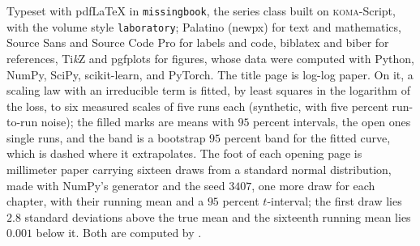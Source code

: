 \medskip
{\small\noindent Typeset with pdf\LaTeX{} in \texttt{missingbook}, the series class built on \textsc{koma}-Script, with the volume style \texttt{laboratory}; Palatino (newpx) for text and mathematics, Source Sans and Source Code Pro for labels and code, biblatex and biber for references, Ti\emph{k}Z and pgfplots for figures, whose data were computed with Python, NumPy, SciPy, scikit-learn, and PyTorch. The title page is log-log paper. On it, a scaling law with an irreducible term is fitted, by least squares in the logarithm of the loss, to six measured scales of five runs each (synthetic, with five percent run-to-run noise); the filled marks are means with $95$ percent intervals, the open ones single runs, and the band is a bootstrap $95$ percent band for the fitted curve, which is dashed where it extrapolates. The foot of each opening page is millimeter paper carrying sixteen draws from a standard normal distribution, made with NumPy's generator and the seed $3407$, one more draw for each chapter, with their running mean and a $95$ percent $t$-interval; the first draw lies $2.8$ standard deviations above the true mean and the sixteenth running mean lies $0.001$ below it. Both are computed by .\par}
